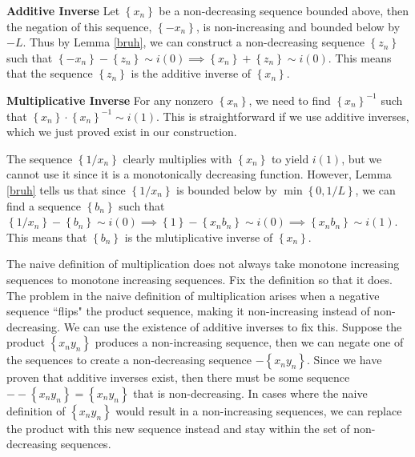 \documentclass[10pt]{amsart}
\theoremstyle{plain}
\newenvironment{exercise}[1]{%
  \renewcommand\themanualtheoreminner{#1}%
  \manualtheoreminner
}{\endmanualtheoreminner}
\theoremstyle{definition}
\newcommand{\<}{\langle}
\renewcommand{\>}{\rangle}
\begin{document}
\textbf{Additive Inverse}
Let $\left\{ x_n \right\}$ be a non-decreasing sequence bounded above, then the negation of this sequence, $\left\{ -x_n \right\}$, is non-increasing and bounded below by $-L$. Thus by Lemma \ref{bruh}, we can construct a non-decreasing sequence $\left\{ z_n \right\}$ such that $\left\{ -x_n \right\} - \left\{ z_n \right\} \sim i(0) \implies \left\{ x_n \right\} + \left\{ z_n \right\} \sim i(0)$. This means that the sequence $\left\{ z_n \right\}$ is the additive inverse of $\left\{ x_n \right\}$.

\textbf{Multiplicative Inverse}
For any nonzero $\left\{ x_n \right\}$, we need to find $\left\{ x_n \right\}^{-1}$ such that $\left\{ x_n \right\} \cdot \left\{ x_n \right\}^{-1} \sim i(1)$. This is straightforward if we use additive inverses, which we just proved exist in our construction.

The sequence $\left\{ 1/x_n  \right\}$ clearly multiplies with $\left\{ x_n \right\}$ to yield $i(1)$, but we cannot use it since it is a monotonically decreasing function. However, Lemma \ref{bruh} tells us that since $\left\{ 1/x_n \right\}$ is bounded below by $\min\left\{ 0, 1/L \right\}$, we can find a sequence  $\left\{ b_n \right\}$ such that $\left\{ 1/x_n \right\}-\left\{ b_n \right\}\sim i(0) \implies \left\{ 1 \right\}-\left\{ x_n b_n \right\} \sim i(0) \implies \left\{ x_n b_n \right\} \sim i(1)$. This means that $\left\{ b_n \right\}$ is the mlutiplicative inverse of $\left\{ x_n \right\}$.

\begin{exercise}{ii}
	The naive definition of multiplication does not always take monotone increasing sequences to monotone increasing sequences. Fix the definition so that it does.
\end{exercise}
The problem in the naive definition of multiplication arises when a negative sequence ``flips" the product sequence, making it non-increasing instead of non-decreasing. We can use the existence of additive inverses to fix this. Suppose the product $\left\{ x_n y_n \right\}$ produces a non-increasing sequence, then we can negate one of the sequences to create a non-decreasing sequence $-\left\{ x_n y_n \right\}$. Since we have proven that additive inverses exist, then there must be some sequence $- -\left\{ x_n y_n \right\} = \left\{ x_n y_n \right\}$ that is non-decreasing. In cases where the naive definition of $\left\{ x_n y_n \right\}$ would result in a non-increasing sequences, we can replace the product with this new sequence instead and stay within the set of non-decreasing sequences.
\end{document}
